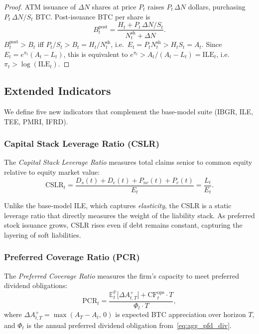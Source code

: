\begin{proof}
ATM issuance of $\Delta N$ shares at price $P_t$ raises $P_t\,\Delta N$
dollars, purchasing $P_t\,\Delta N / S_t$ BTC.  Post-issuance BTC per share
is
\[
  B_t^{\mathrm{post}}
  = \frac{H_t + P_t\,\Delta N / S_t}{N_t^{\mathrm{sh}} + \Delta N}.
\]
$B_t^{\mathrm{post}} > B_t$ iff $P_t / S_t > B_t = H_t / N_t^{\mathrm{sh}}$,
i.e.\ $E_t = P_t N_t^{\mathrm{sh}} > H_t S_t = A_t$.  Since
$E_t = e^{\pi_t}(A_t - L_t)$, this is equivalent to
$e^{\pi_t} > A_t / (A_t - L_t) = \mathrm{ILE}_t$, i.e.\
$\pi_t > \log(\mathrm{ILE}_t)$.
\end{proof}

\subsection{Extended Indicators}\label{subsec:new_indicators}

We define five new indicators that complement the base-model suite
(IBGR, ILE, TEE, PMRI, IFRD).

\subsubsection{Capital Stack Leverage Ratio (CSLR)}

\begin{definition}[CSLR]\label{def:cslr}
The \emph{Capital Stack Leverage Ratio} measures total claims senior to
common equity relative to equity market value:
\begin{equation}\label{eq:cslr}
  \mathrm{CSLR}_t
  = \frac{D_s(t) + D_c(t) + P_{nc}(t) + P_c(t)}{E_t}
  = \frac{L_t}{E_t}.
\end{equation}
\end{definition}

\noindent Unlike the base-model ILE, which captures \emph{elasticity},
the CSLR is a static leverage ratio that directly measures the weight
of the liability stack.  As preferred stock issuance grows, CSLR rises
even if debt remains constant, capturing the layering of soft liabilities.

\subsubsection{Preferred Coverage Ratio (PCR)}

\begin{definition}[PCR]\label{def:pcr}
The \emph{Preferred Coverage Ratio} measures the firm's capacity to
meet preferred dividend obligations:
\begin{equation}\label{eq:pcr}
  \mathrm{PCR}_t
  = \frac{\mathbb{E}_t^{\mathbb{P}}\!\bigl[\Delta A_{t,T}^+\bigr]
          + \mathrm{CF}_t^{\mathrm{ops}}\cdot T}
         {\Phi_t \cdot T},
\end{equation}
where $\Delta A_{t,T}^+ = \max(A_T - A_t,\, 0)$ is expected BTC
appreciation over horizon $T$, and $\Phi_t$ is the annual preferred
dividend obligation from~\eqref{eq:agg_pfd_div}.
\end{definition}

